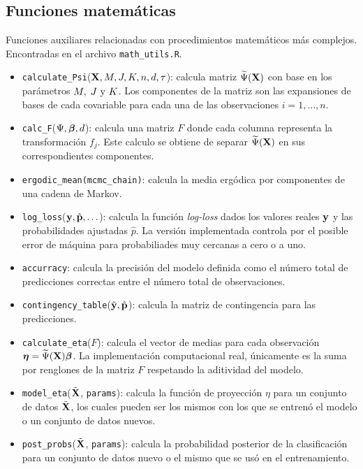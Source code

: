 \documentclass[../../Main/Main.tex]{subfiles}
\begin{document}
\subsection*{Funciones matemáticas}
Funciones auxiliares relacionadas con procedimientos matemáticos más complejos. Encontradas en el archivo \verb|math_utils.R|.
\begin{itemize}[label = {}]
	\item \verb|calculate_Psi|($\mathbf{X},M,J,K,n,d,\tau$): calcula matriz $\widetilde{\Psi}(\mathbf{X})$ con base en los parámetros $M,\;J\text{ y }K$. Los componentes de la matriz son las expansiones de bases de cada covariable para cada una de las observaciones $i=1,\ldots,n$.
	\item \verb|calc_F|($\Psi, \bm{\beta}, d$): calcula una matriz $F$ donde cada columna representa la transformación $f_j$. Este calculo se obtiene de separar $\widetilde{\Psi}(\mathbf{X})$ en sus correspondientes componentes.
	\item \verb|ergodic_mean(mcmc_chain)|: calcula la media ergódica por componentes de una cadena de Markov.
	\item \verb|log_loss|($\mathbf{y},\hat{\mathbf{p}},\ldots $): calcula la función \textit{log-loss} dados los valores reales $\mathbf{y}$ y las probabilidades ajustadas $\hat{p}$. La versión implementada controla por el posible error de máquina para probabiliades muy cercanas a cero o a uno.
	\item \verb|accurracy|: calcula la precisión del modelo definida como el número total de predicciones correctas entre el número total de observaciones.
	\item \verb|contingency_table|($\tilde{\mathbf{y}},\hat{\mathbf{p}}$): calcula la matriz de contingencia para las predicciones. 
	\item \verb|calculate_eta|($F$): calcula el vector de medias para cada observación $\bm{\eta} = \widetilde{\Psi}(\mathbf{X})\bm{\beta}$. La implementación computacional real, únicamente es la suma por renglones de la matriz $F$ respetando la aditividad del modelo.
	\item \verb|model_eta|($\tilde{\mathbf{X}}$, \verb|params|): calcula la función de proyección $\eta$ para un conjunto de datos $\tilde{\mathbf{X}}$, los cuales pueden ser los mismos con los que se entrenó el modelo o un conjunto de datos nuevos.
	\item \verb|post_probs|($\tilde{\mathbf{X}}$, \verb|params|): calcula la probabilidad posterior de la clasificación para un conjunto de datos nuevo o el mismo que se usó en el entrenamiento. 
\end{itemize}
\end{document}
